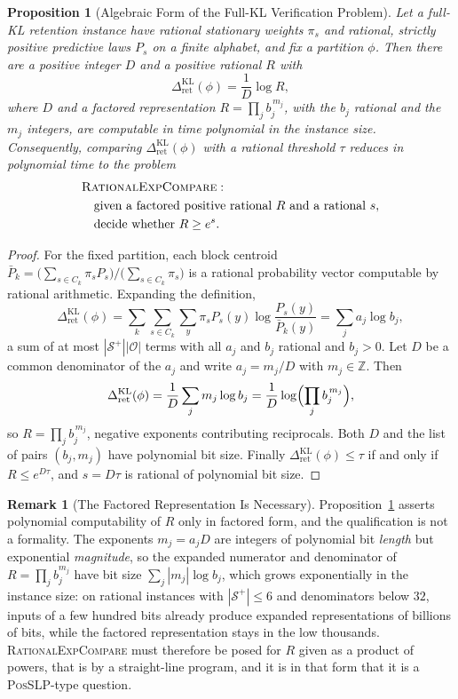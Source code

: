 \documentclass[12pt]{article}
\newtheorem{proposition}[theorem]{Proposition}
\theoremstyle{definition}
\newtheorem{remark}[theorem]{Remark}
\newcommand{\RetKL}{\Delta_{\mathrm{ret}}^{\mathrm{KL}}}
\newcommand{\Splus}{\mathcal S^{+}}
\begin{document}
\begin{proposition}[Algebraic Form of the Full-KL Verification Problem]
\label{prop:full-kl-algebraic-form}
Let a full-KL retention instance have rational stationary weights $\pi_s$ and
rational, strictly positive predictive laws $P_s$ on a finite alphabet, and fix
a partition $\phi$.  Then there are a positive integer $D$ and a positive
rational $R$ with
\[
\RetKL(\phi)=\frac1D\log R ,
\]
where $D$ and a \emph{factored} representation
$R=\prod_jb_j^{\,m_j}$, with the $b_j$ rational and the $m_j$ integers, are
computable in time polynomial in the instance size.  Consequently, comparing
$\RetKL(\phi)$ with a rational threshold $\tau$ reduces in polynomial time to
the problem
\[
\begin{aligned}
&\textup{\textsc{RationalExpCompare}}:\\
&\quad\text{given a factored positive rational }R
\text{ and a rational }s,\\
&\quad\text{decide whether }R\ge e^{s}.
\end{aligned}
\]
\end{proposition}

\begin{proof}
For the fixed partition, each block centroid
$\bar P_k=\bigl(\sum_{s\in C_k}\pi_sP_s\bigr)/\bigl(\sum_{s\in C_k}\pi_s\bigr)$
is a rational probability vector computable by rational arithmetic.  Expanding
the definition,
\[
\RetKL(\phi)
=
\sum_k\sum_{s\in C_k}\sum_y\pi_sP_s(y)\log\frac{P_s(y)}{\bar P_k(y)}
=
\sum_ja_j\log b_j ,
\]
a sum of at most $|\Splus||\mathcal O|$ terms with all $a_j$ and $b_j$ rational
and $b_j>0$.  Let $D$ be a common denominator of the $a_j$ and write
$a_j=m_j/D$ with $m_j\in\mathbb Z$.  Then
\[
\RetKL(\phi)=\frac1D\sum_jm_j\log b_j=\frac1D\log\Bigl(\prod_jb_j^{\,m_j}\Bigr),
\]
so $R=\prod_jb_j^{\,m_j}$, negative exponents contributing reciprocals.  Both
$D$ and the list of pairs $(b_j,m_j)$ have polynomial bit size.  Finally
$\RetKL(\phi)\le\tau$ if and only if $R\le e^{D\tau}$, and $s=D\tau$ is
rational of polynomial bit size.
\end{proof}

\begin{remark}[The Factored Representation Is Necessary]
\label{rem:full-kl-slp}
Proposition~\ref{prop:full-kl-algebraic-form} asserts polynomial computability
of $R$ only in factored form, and the qualification is not a formality.  The
exponents $m_j=a_jD$ are integers of polynomial bit \emph{length} but
exponential \emph{magnitude}, so the expanded numerator and denominator of
$R=\prod_jb_j^{m_j}$ have bit size $\sum_j|m_j|\log b_j$, which grows
exponentially in the instance size: on rational instances with $|\Splus|\le6$
and denominators below $32$, inputs of a few hundred bits already produce
expanded representations of billions of bits, while the factored
representation stays in the low thousands.  \textup{\textsc{RationalExpCompare}} must
therefore be posed for $R$ given as a product of powers, that is by a straight-line
program, and it is in that form that it is a \textup{\textsc{PosSLP}}-type question.
\end{remark}
\end{document}
